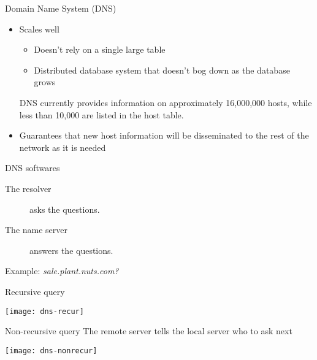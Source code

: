 \begin{frame}{Domain Name System (DNS)}
  \begin{itemize}
  \item Scales well
    \begin{itemize}
    \item Doesn't rely on a single large table
    \item Distributed database system that doesn't bog down as the database grows
    \end{itemize}
    DNS currently provides information on approximately 16,000,000 hosts, while less than
    10,000 are listed in the host table.
  \item Guarantees that new host information will be disseminated to the rest of the
    network as it is needed
  \end{itemize}
\end{frame}

\begin{frame}{DNS softwares}
  \begin{center}
  \end{center}
  \begin{description}
  \item[The resolver]  asks the questions.
  \item[The name server]  answers the questions.
  \end{description}
\end{frame}

\begin{frame}{Example: \emph{sale.plant.nuts.com?}}
  \begin{iblock}{Recursive query}    
    \begin{center}
      \texttt{[image: dns-recur]}
    \end{center}
  \end{iblock}
  \begin{iblock}{Non-recursive query}
    The remote server tells the local server who to ask next
    \begin{center}
      \texttt{[image: dns-nonrecur]}\label{fig:non_recursive}
    \end{center}
  \end{iblock}
\end{frame}

